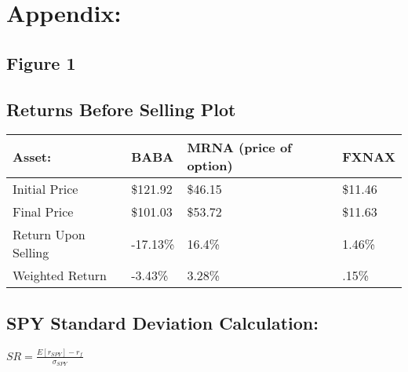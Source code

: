 \documentclass{article}
\begin{document}
\section{Appendix:}

\subsection{Figure 1}

\begin{center}
\end{center}

\subsection{Returns Before Selling Plot}

\begin{table}[!ht]
    \centering
    \begin{tabular}{|l|l|l|l|}
    \hline
        Asset: & BABA & MRNA (price of option) & FXNAX \\ \hline
        Initial Price & \$121.92 & \$46.15 & \$11.46 \\ \hline
        Final Price & \$101.03 & \$53.72 & \$11.63 \\ \hline
        Return Upon Selling & -17.13\% & 16.4\% & 1.46\% \\ \hline
        Weighted Return & -3.43\% & 3.28\% & .15\% \\ \hline
    \end{tabular}
\end{table}

\subsection{SPY Standard Deviation Calculation:}

\begin{center}
    \begin{math}
        SR = \frac{E[r_{SPY}]-r_f}{\sigma_{SPY}}
    \end{math}
\end{center}
\end{document}
